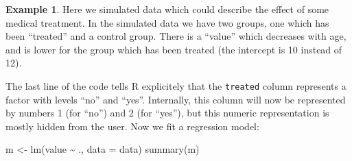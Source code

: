 \documentclass[
  a4paper,
]{article}
\newenvironment{Shaded}{\begin{snugshade}}{\end{snugshade}}
\newcommand{\AttributeTok}[1]{\textcolor[rgb]{0.77,0.63,0.00}{#1}}
\newcommand{\DecValTok}[1]{\textcolor[rgb]{0.00,0.00,0.81}{#1}}
\newcommand{\FloatTok}[1]{\textcolor[rgb]{0.00,0.00,0.81}{#1}}
\newcommand{\FunctionTok}[1]{\textcolor[rgb]{0.00,0.00,0.00}{#1}}
\newcommand{\NormalTok}[1]{#1}
\newcommand{\OtherTok}[1]{\textcolor[rgb]{0.56,0.35,0.01}{#1}}
\newcommand{\SpecialCharTok}[1]{\textcolor[rgb]{0.00,0.00,0.00}{#1}}
\newcommand{\StringTok}[1]{\textcolor[rgb]{0.31,0.60,0.02}{#1}}
\theoremstyle{definition}
\theoremstyle{definition}
\newtheorem{example}{Example}[section]
\theoremstyle{definition}
\theoremstyle{definition}
\theoremstyle{remark}
\begin{document}
\begin{example}
Here we simulated data which could describe the effect of some
medical treatment.
In the simulated data we have two groups, one which has been ``treated''
and a control group. There is a ``value'' which decreases with age,
and is lower for the group which has been treated (the intercept is 10
instead of 12).

\begin{Shaded}
\end{Shaded}

The last line of the code tells R explicitely that the \texttt{treated} column
represents a factor with levels ``no'' and ``yes''. Internally, this column will
now be represented by numbers 1 (for ``no'') and 2 (for ``yes''), but this numeric representation
is mostly hidden from the user. Now we fit a regression model:

\begin{Shaded}
\begin{Highlighting}[]
\NormalTok{m }\OtherTok{\textless{}{-}} \FunctionTok{lm}\NormalTok{(value }\SpecialCharTok{\textasciitilde{}}\NormalTok{ ., }\AttributeTok{data =}\NormalTok{ data)}
\FunctionTok{summary}\NormalTok{(m)}
\end{Highlighting}
\end{Shaded}


\end{example}
\end{document}
